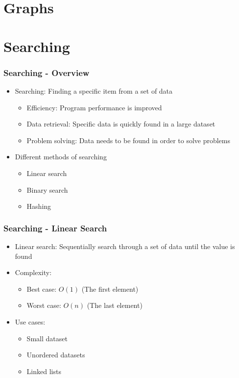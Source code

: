 \documentclass[c, aspectratio=169]{beamer}
\begin{document}
\section{Graphs}
\begin{frame}\end{frame}
\begin{frame}\end{frame}
\begin{frame}\end{frame}

\section{Searching}
\begin{frame}\frametitle{Searching - Overview}
\begin{itemize}
\item Searching: Finding a specific item from a set of data
	\begin{itemize}
	\item Efficiency: Program performance is improved
	\item Data retrieval: Specific data is quickly found in a large dataset
	\item Problem solving: Data needs to be found in order to solve problems
	\end{itemize}
\item Different methods of searching
	\begin{itemize}
	\item Linear search
	\item Binary search
	\item Hashing
	\end{itemize}
\end{itemize}
\end{frame}

\begin{frame}\frametitle{Searching - Linear Search}
\begin{itemize}
\item Linear search: Sequentially search through a set of data until the value is found
\item Complexity:
	\begin{itemize}
	\item Best case: $O(1)$ (The first element)
	\item Worst case: $O(n)$ (The last element)
	\end{itemize}
\item Use cases:
	\begin{itemize}
	\item Small dataset
	\item Unordered datasets
	\item Linked lists
	\end{itemize}
\end{itemize}
\end{frame}
\end{document}
